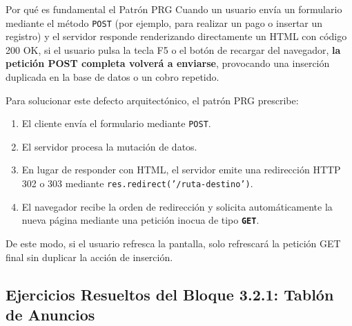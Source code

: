 \begin{importante}{Por qué es fundamental el Patrón PRG}
Cuando un usuario envía un formulario mediante el método \texttt{POST} (por ejemplo, para realizar un pago o insertar un registro) y el servidor responde renderizando directamente un HTML con código 200 OK, si el usuario pulsa la tecla F5 o el botón de recargar del navegador, \textbf{la petición POST completa volverá a enviarse}, provocando una inserción duplicada en la base de datos o un cobro repetido.

Para solucionar este defecto arquitectónico, el patrón PRG prescribe:
\begin{enumerate}
    \item El cliente envía el formulario mediante \texttt{POST}.
    \item El servidor procesa la mutación de datos.
    \item En lugar de responder con HTML, el servidor emite una redirección HTTP 302 o 303 mediante \texttt{res.redirect('/ruta-destino')}.
    \item El navegador recibe la orden de redirección y solicita automáticamente la nueva página mediante una petición inocua de tipo \textbf{\texttt{GET}}.
\end{enumerate}
De este modo, si el usuario refresca la pantalla, solo refrescará la petición GET final sin duplicar la acción de inserción.
\end{importante}

\subsection{Ejercicios Resueltos del Bloque 3.2.1: Tablón de Anuncios}

